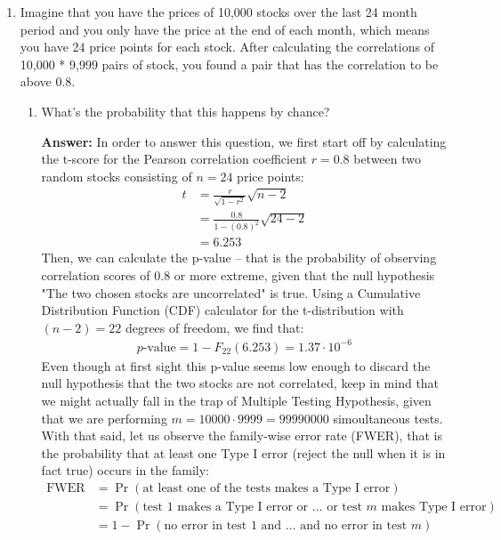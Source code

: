 \documentclass{article}
\newenvironment{QandA}{\begin{enumerate}[label=\arabic*.]}{\end{enumerate}}
\newenvironment{InnerQandA}{\begin{enumerate}[label=\roman*.]}{\end{enumerate}}
\newenvironment{answer}{\par\normalfont \textbf{Answer:}}{}
\begin{document}
\begin{QandA}
    \item Imagine that you have the prices of 10,000 stocks over the last 24 month period and you only have the price at the end of each month, which means you have 24 price points for each stock. After calculating the correlations of 10,000 * 9,999 pairs of stock, you found a pair that has the correlation to be above 0.8.
    \begin{InnerQandA}
        \item What’s the probability that this happens by chance?
        \begin{answer}
            In order to answer this question, we first start off by calculating the t-score for the Pearson correlation coefficient $r=0.8$ between two random stocks consisting of $n=24$ price points:
            \begin{align*}
                t &= \frac{r}{\sqrt{1 - r^2}} \sqrt{n - 2} \\
                &= \frac{0.8}{1 - (0.8)^{2}} \sqrt{24 - 2} \\
                &= 6.253
            \end{align*}
            Then, we can calculate the p-value -- that is the probability of observing correlation scores of $0.8$ or more extreme, given that the null hypothesis "The two chosen stocks are uncorrelated" is true. Using a Cumulative Distribution Function (CDF) calculator for the t-distribution with $(n-2) = 22$ degrees of freedom, we find that:
            \begin{align*}
                p\text{-value} = 1 - F_{22}(6.253) = 1.37 \cdot 10^{-6}
            \end{align*}
            Even though at first sight this p-value seems low enough to discard the null hypothesis that the two stocks are not correlated, keep in mind that we might actually fall in the trap of Multiple Testing Hypothesis, given that we are performing $m = 10000 \cdot 9999 = 99990000$ simoultaneous tests. With that said, let us observe the family-wise error rate (FWER), that is the probability that at least one Type I error (reject the null when it is in fact true) occurs in the family:
            \begin{align*}
                \text{FWER} &= \Pr (\text{at least one of the tests makes a Type I error}) \\
                &= \Pr(\text{test } 1 \text{ makes a Type I error or }\ldots \text{ or test } m \text{ makes Type I error}) \\
                &= 1 - \Pr(\text{no error in test } 1 \text{ and } \ldots \text{ and no error in test } m) \\

\end{align*}
\end{answer}
\end{InnerQandA}
\end{QandA}
\end{document}
